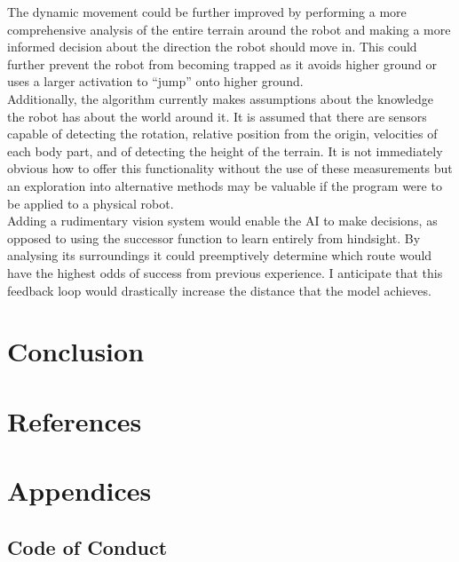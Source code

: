 \documentclass{article}
\begin{document}
The dynamic movement could be further improved by performing a more comprehensive analysis of the entire terrain around the robot and making a more informed decision about the direction the robot should move in. This could further prevent the robot from becoming trapped as it avoids higher ground or uses a larger activation to “jump” onto higher ground.\\ Additionally, the algorithm currently makes assumptions about the knowledge the robot has about the world around it. It is assumed that there are sensors capable of detecting the rotation, relative position from the origin, velocities of each body part, and of detecting the height of the terrain. It is not immediately obvious how to offer this functionality without the use of these measurements but an exploration into alternative methods may be valuable if the program were to be applied to a physical robot. \\


Adding a rudimentary vision system would enable the AI to make decisions, as opposed to using the successor function to learn entirely from hindsight. By analysing its surroundings it could preemptively determine which route would have the highest odds of success from previous experience. I anticipate that this feedback loop would drastically increase the distance that the model achieves. 



\newpage
\section{Conclusion}

\newpage

\section{References}

\newpage
\section{Appendices}
\subsection{Code of Conduct}
\end{document}
